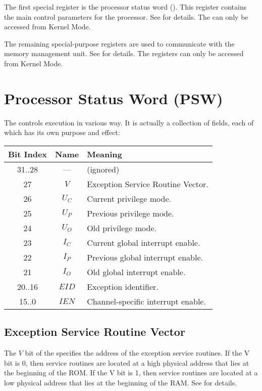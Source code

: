 The first special register is the processor status word (\pswx). This register contains the main control parameters for the processor. See  for details. The \psw can only be accessed from Kernel Mode.

The remaining special-purpose registers are used to communicate with the memory management unit. See  for details. The \mmu registers can only be accessed from Kernel Mode.

\section{Processor Status Word (PSW)}

The \psw controls execution in various way. It is actually a collection of fields, each of which has its own purpose and effect:

\begin{tabular}{|c|c|l|}
\hline
Bit Index & Name & Meaning\\
\hline
31..28 & --- & (ignored) \\
27 & $V$ & Exception Service Routine Vector. \\
26 & $U_C$ & Current privilege mode.\\
25 & $U_P$ & Previous privilege mode.\\
24 & $U_O$ & Old privilege mode.\\
23 & $I_C$ & Current global interrupt enable.\\
22 & $I_P$ & Previous global interrupt enable.\\
21 & $I_O$ & Old global interrupt enable.\\
20..16 & $EID$ & Exception identifier.\\
15..0 & $IEN$ & Channel-specific interrupt enable.\\
\hline
\end{tabular}

\subsection{Exception Service Routine Vector}

The $V$ bit of the \psw specifies the address of the exception service routines. If the V bit is 0, then service routines are located at a high physical address that lies at the beginning of the ROM. If the V bit is 1, then service routines are located at a low physical address that lies at the beginning of the RAM. See  for details.

